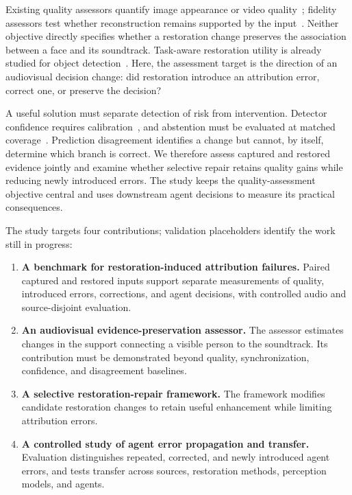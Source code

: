 Existing quality assessors quantify image appearance or video quality~\cite{musiq,brisque,dover}; fidelity assessors test whether reconstruction remains supported by the input~\cite{cdi,hs}. Neither objective directly specifies whether a restoration change preserves the association between a face and its soundtrack. Task-aware restoration utility is already studied for object detection~\cite{taskguard}. Here, the assessment target is the direction of an audiovisual decision change: did restoration introduce an attribution error, correct one, or preserve the decision?

A useful solution must separate detection of risk from intervention. Detector confidence requires calibration~\cite{calibration}, and abstention must be evaluated at matched coverage~\cite{selective}. Prediction disagreement identifies a change but cannot, by itself, determine which branch is correct. We therefore assess captured and restored evidence jointly and examine whether selective repair retains quality gains while reducing newly introduced errors. The study keeps the quality-assessment objective central and uses downstream agent decisions to measure its practical consequences.

The study targets four contributions; validation placeholders identify the work still in progress:
\begin{enumerate}
\item \textbf{A benchmark for restoration-induced attribution failures.} Paired captured and restored inputs support separate measurements of quality, introduced errors, corrections, and agent decisions, with controlled audio and source-disjoint evaluation. 
\item \textbf{An audiovisual evidence-preservation assessor.} The assessor estimates changes in the support connecting a visible person to the soundtrack. Its contribution must be demonstrated beyond quality, synchronization, confidence, and disagreement baselines. 
\item \textbf{A selective restoration-repair framework.} The framework modifies candidate restoration changes to retain useful enhancement while limiting attribution errors. 
\item \textbf{A controlled study of agent error propagation and transfer.} Evaluation distinguishes repeated, corrected, and newly introduced agent errors, and tests transfer across sources, restoration methods, perception models, and agents. 
\end{enumerate}



